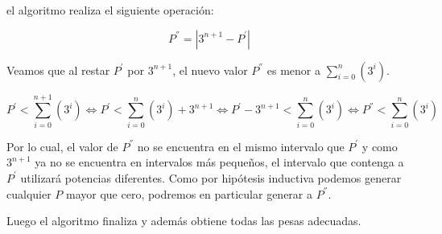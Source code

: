 el algoritmo realiza el siguiente operación:

\begin{equation}
P^{''} = | 3^{n+1} - P^{'} |
\end{equation} 

Veamos que al restar $P^{'}$ por $3^{n+1}$, el nuevo valor $P^{''}$ es menor a $\sum_{i=0}^{n}(3^i)$.

\begin{equation}
P^{'} < \sum_{i=0}^{n+1}(3^i) \iff
P^{'} < \sum_{i=0}^{n}(3^i) + 3^{n+1} \iff
P^{'} - 3^{n+1} < \sum_{i=0}^{n}(3^i) \iff
P^{''}  < \sum_{i=0}^{n}(3^i)
\end{equation}

Por lo cual, el valor de $P^{''}$ no se encuentra en el mismo intervalo que $P^{'}$ y como $3^{n+1}$ ya no se encuentra en intervalos más pequeños, el intervalo que contenga a $P^{'}$ utilizará potencias diferentes. Como por hipótesis inductiva podemos generar cualquier $P$ mayor que cero, podremos en particular generar a $P^{''}$.

Luego el algoritmo finaliza y además obtiene todas las pesas adecuadas.\\

